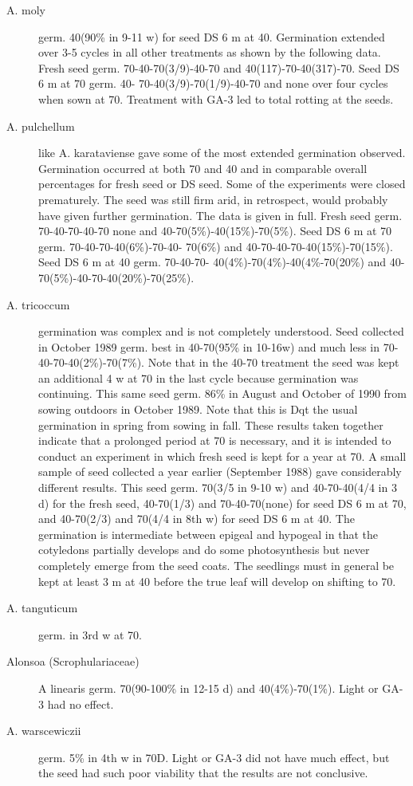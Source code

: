 \begin{description}
\item[A. moly] germ. 40(90\% in 9-11 w) for seed DS 6 m at 40. Germination extended
over 3-5 cycles in all other treatments as shown by the following data. Fresh seed
germ. 70-40-70(3/9)-40-70 and 40(117)-70-40(317)-70. Seed DS 6 m at 70 germ. 40-
70-40(3/9)-70(1/9)-40-70 and none over four cycles when sown at 70. Treatment with
GA-3 led to total rotting at the seeds.
\item[A. pulchellum] like A. karataviense gave some of the most extended germination
observed. Germination occurred at both 70 and 40 and in comparable overall
percentages for fresh seed or DS seed. Some of the experiments were closed
prematurely. The seed was still firm arid, in retrospect, would probably have given
further germination. The data is given in full. Fresh seed germ. 70-40-70-40-70 none
and 40-70(5\%)-40(15\%)-70(5\%). Seed DS 6 m at 70 germ. 70-40-70-40(6\%)-70-40-
70(6\%) and 40-70-40-70-40(15\%)-70(15\%). Seed DS 6 m at 40 germ. 70-40-70-
40(4\%)-70(4\%)-40(4\%-70(20\%) and 40-70(5\%)-40-70-40(20\%)-70(25\%).
\item[A. tricoccum] germination was complex and is not completely understood. Seed
collected in October 1989 germ. best in 40-70(95\% in 10-16w) and much less in 70-
40-70-40(2\%)-70(7\%). Note that in the 40-70 treatment the seed was kept an
additional 4 w at 70 in the last cycle because germination was continuing. This same
seed germ. 86\% in August and October of 1990 from sowing outdoors in October
1989. Note that this is Dqt the usual germination in spring from sowing in fall. These
results taken together indicate that a prolonged period at 70 is necessary, and it is
intended to conduct an experiment in which fresh seed is kept for a year at 70. A small
sample of seed collected a year earlier (September 1988) gave considerably different
results. This seed germ. 70(3/5 in 9-10 w) and 40-70-40(4/4 in 3 d) for the fresh seed,
40-70(1/3) and 70-40-70(none) for seed DS 6 m at 70, and 40-70(2/3) and 70(4/4 in
8th w) for seed DS 6 m at 40. The germination is intermediate between epigeal and
hypogeal in that the cotyledons partially develops and do some photosynthesis but
never completely emerge from the seed coats. The seedlings must in general be kept
at least 3 m at 40 before the true leaf will develop on shifting to 70.
\item[A. tanguticum] germ. in 3rd w at 70.

\item[Alonsoa (Scrophulariaceae)]
A linearis germ. 70(90-100\% in 12-15 d) and 40(4\%)-70(1\%). Light or GA-3
had no effect.
\item[A. warscewiczii] germ. 5\% in 4th w in 70D. Light or GA-3 did not have much
effect, but the seed had such poor viability that the results are not conclusive.


\end{description}
